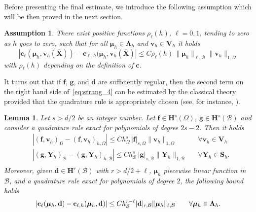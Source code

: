 \documentclass[oneside]{amsart} %
\newcommand{\abs}[1]{\left\lvert#1\right\rvert}
\newtheorem{lem}{Lemma}
\newtheorem{assump}{Assumption}
\newcommand\B{\mathcal B} %
\renewcommand\v{\mathbf{v}} %
\renewcommand\d{\mathbf{d}} %
\renewcommand\c{\mathbf{c}} %
\newcommand\f{\mathbf{f}} %
\newcommand\g{\mathbf{g}} %
\renewcommand\S{\mathbf{S}} %
\newcommand\X{\mathbf{X}} %
\newcommand\Xbar{\overline{\X}} %
\newcommand\Y{\mathbf{Y}} %
\newcommand\LL{{\boldsymbol{\Lambda}}} %
\newcommand\Vline{\mathbf{V}} %
\newcommand\Sline{\S} %
\newcommand\mmu{{\boldsymbol\mu}} %
\newcommand{\crhsL}[2]{\c_{\ell,h}(#1,#2)}
\newcommand\DB{\begin{color}{black}}
\newcommand\BD{\end{color}}
\begin{document}
	Before presenting the final estimate, we introduce the following assumption which will be then proved in the next section.
	\begin{assump}\label{assump:quad_er}
		There exist positive functions $\rho_{\ell}(h)$, $\ell=0,1$, tending to zero as $h$ goes to zero, such that for all $\mmu_h\in\LL_h$ and $\v_h\in\Vline_h$ it holds
		\begin{equation*}
			|\c_\ell(\mmu_h,\v_h(\Xbar))-\c_{\ell,h}(\mmu_h,\v_h(\Xbar)| \le C \rho_\ell(h)\,\|\mmu_h\|_{\ell,\B}\|\v_h\|_{1,\Omega}
		\end{equation*}
		with $\rho_{\ell}(h)$ depending on the definition of $\c$.
	\end{assump}
	It turns out that if $\f$, $\g$, and $\d$ are sufficiently regular, then the second term on the right hand side of~\eqref{eq:strang_4} can be estimated by the classical theory provided that the quadrature rule is appropriately chosen (see, for instance, \cite{ciarlet2002finite}).
	\begin{lem}
		Let $s>d/2$ be an integer number. Let $\f\in\mathbf{H}^s(\Omega)$,
		$\g\in \mathbf{H}^s(\B)$ and consider a quadrature rule exact for polynomials
		of degree $2s-2$. Then it holds
		\begin{equation}\label{eq:rhs_fg}
			\begin{aligned}
				&\abs{(\f,\v_h)_\Omega - (\f,\v_h)_{h,\Omega}}\le Ch_\Omega^s\,|\f|_{s,\Omega}\|\v_h\|_{1,\Omega}&&\forall\v_h\in\Vline_h\\
				&\abs{(\g,\Y_h)_\B - (\g,\Y_h)_{h,\B}}\le Ch_\B^s\,|\g|_{s,\B}\|\Y_h\|_{1,\B}&&\forall\Y_h\in\Sline_h.\\
			\end{aligned}
		\end{equation}
		Moreover, given $\d\in\mathbf{H}^r(\B)$ with $r>d/2+\ell$,
		$\mmu_h$ piecewise linear function in $\B$, and a quadrature rule exact for
		polynomials of degree $2$, the following bound holds
		\begin{equation}\label{eq:rhs_d}
			|\c_\ell(\mmu_h,\d)-\crhsL{\mmu_h}{\d}|\le
			Ch_\B^{r-\ell}\DB|\d|_{r,\B}\BD\|\mmu_h\|_{\ell,\B}\qquad \forall\mmu_h\in\LL_h.
		\end{equation}
	\end{lem}
	
\end{document}
